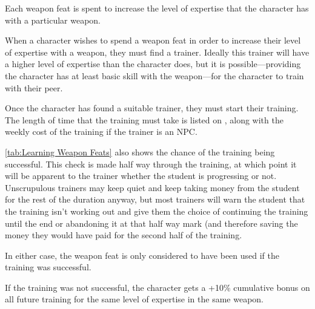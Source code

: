 \begin{multicols*}{2}
Each weapon feat is spent to increase the level of expertise that the character has with a particular weapon.

When a character wishes to spend a weapon feat in order to increase their level of expertise with a weapon, they must find a trainer. Ideally this trainer will have a higher level of expertise than the character does, but it is possible—providing the character has at least basic skill with the weapon—for the character to train with their peer.

Once the character has found a suitable trainer, they must start their training. The length of time that the training must take is listed on , along with the weekly cost of the training if the trainer is an NPC.

\autoref*{tab:Learning Weapon Feats} also shows the chance of the training being successful. This check is made half way through the training, at which point it will be apparent to the trainer whether the student is progressing or not. Unscrupulous trainers may keep quiet and keep taking money from the student for the rest of the duration anyway, but most trainers will warn the student that the training isn’t working out and give them the choice of continuing the training until the end or abandoning it at that half way mark (and therefore saving the money they would have paid for the second half of the training.

In either case, the weapon feat is only considered to have been used if the training was successful.

If the training was not successful, the character gets a +10\% cumulative bonus on all future training for the same level of expertise in the same weapon.

\end{multicols*}
